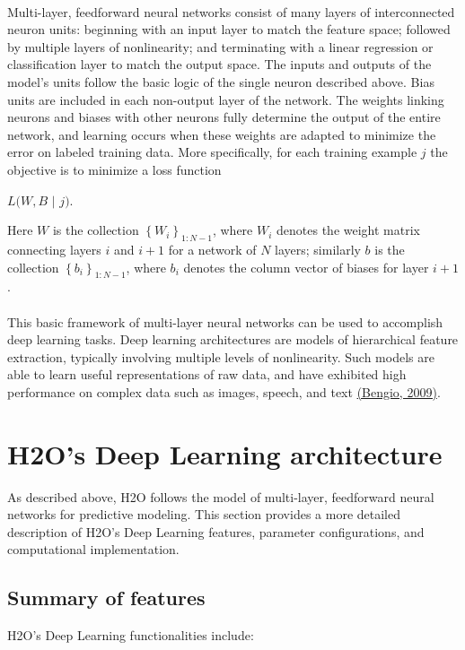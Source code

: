 \documentclass[11pt]{article}
\begin{document}
\\
\noindent
Multi-layer, feedforward neural networks consist of many layers of interconnected neuron units: beginning with an input layer to match the feature space; followed by multiple layers of nonlinearity; and terminating with a linear regression or classification layer to match the output space. The inputs and outputs of the model's units follow the basic logic of the single neuron described above. Bias units are included in each non-output layer of the network. The weights linking neurons and biases with other neurons fully determine the output of the entire network, and learning occurs when these weights are adapted to minimize the error on labeled training data. More specifically, for each training example $j$ the objective is to minimize a loss function 
\begin{center}
$L(W,B$ $|$ $j)$.
\end{center}
Here $W$ is the collection $\left\{W_i\right\}_{1:N-1}$, where $W_i$ denotes the weight matrix connecting layers $i$ and $i+1$ for a network of $N$ layers; similarly $b$ is the collection $\left\{b_i\right\}_{1:N-1}$, where $b_i$ denotes the column vector of biases for layer $i+1$. 
\\
\\
This basic framework of multi-layer neural networks can be used to accomplish deep learning tasks. Deep learning architectures are models of hierarchical feature extraction, typically involving multiple levels of nonlinearity. Such models are able to learn useful representations of raw data, and have exhibited high performance on complex data such as images, speech, and text \href{http://www.iro.umontreal.ca/~lisa/pointeurs/TR1312.pdf}{(Bengio, 2009)}. 


\section{H2O's Deep Learning architecture} \label{2}

As described above, H2O follows the model of multi-layer, feedforward neural networks for predictive modeling. This section provides a more detailed description of H2O's Deep Learning features, parameter configurations, and computational implementation.

\subsection{Summary of features} \label{2.1}
H2O's Deep Learning functionalities include:
\end{document}
